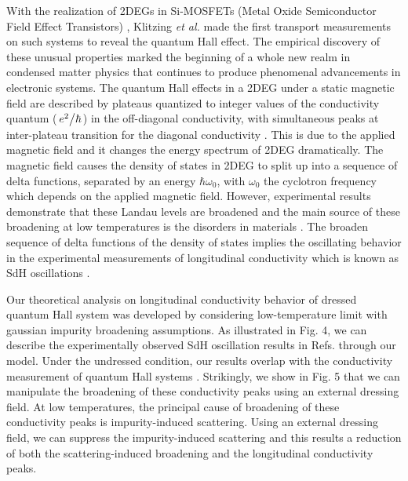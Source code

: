 \documentclass{article}
\begin{document}
\begin{itemize}
{  With the realization of 2DEGs in Si-MOSFETs (Metal Oxide Semiconductor Field Effect Transistors) \citep{fowler66}, Klitzing \textit{et al.} \cite{klitzing80} made the first transport measurements on such systems to reveal the quantum Hall effect. The empirical discovery of these unusual properties marked the beginning of a whole new realm in condensed matter physics that continues to produce phenomenal advancements in electronic systems. The quantum Hall effects in a 2DEG under a static magnetic field are described by plateaus quantized to integer values of the conductivity quantum ($\flatfrac{e^2}{\hbar}$) in the off-diagonal conductivity, with simultaneous peaks at inter-plateau transition for the diagonal conductivity \cite{endo09}. This is due to the applied magnetic field and it changes the energy spectrum of 2DEG dramatically. The magnetic field causes the density of states in 2DEG to split up into a sequence of delta functions, separated by an energy $\hbar\omega_0$, with $\omega_0$ the cyclotron frequency which depends on the applied magnetic field.
  However, experimental results demonstrate that these Landau levels are broadened and the main source of these broadening at low temperatures is the disorders in materials \cite{ando85,dial07}. The broaden sequence of delta functions of the density of states implies the oscillating behavior in the experimental measurements of longitudinal conductivity which is known as SdH oscillations \cite{endo09,wakabayashi78}.

  Our theoretical analysis on longitudinal conductivity behavior of dressed quantum Hall system was developed by considering low-temperature limit with gaussian impurity broadening assumptions.
  As illustrated in Fig. 4, we can describe the experimentally observed SdH oscillation results in Refs.\cite{endo09,wakabayashi78} through our model.
  Under the undressed condition, our results overlap with the conductivity measurement of quantum Hall systems \cite{endo09}. Strikingly, we show in Fig. 5 that we can manipulate the broadening of these conductivity peaks using an external dressing field. At low temperatures, the principal cause of broadening of these conductivity peaks is impurity-induced scattering. Using an external dressing field, we can suppress the impurity-induced scattering and this results a reduction of both the scattering-induced broadening and the longitudinal conductivity peaks.

}
\end{itemize}
\end{document}
